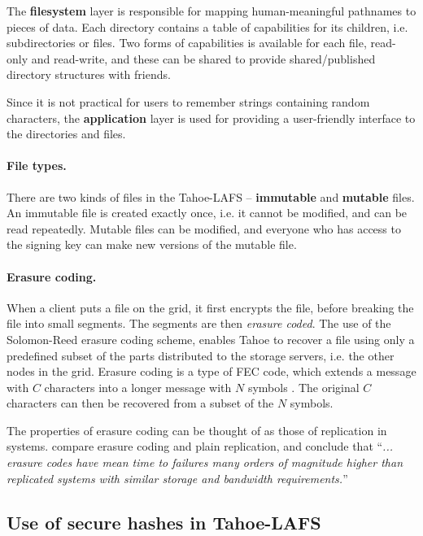 \documentclass[english,12pt,a4paper]{book}
\begin{document}
The \textbf{filesystem} layer is responsible for mapping human-meaningful
pathnames to pieces of data. Each directory contains a table of capabilities
for its children, i.e. subdirectories or files. Two forms of capabilities is
available for each file, read-only and read-write, and these can be shared to
provide shared/published directory structures with friends.

Since it is not practical for users to remember strings containing random
characters, the \textbf{application} layer is used for providing a user-friendly
interface to the directories and files.

\paragraph{File types.}

There are two kinds of files in the Tahoe-\ac{LAFS} -- \textbf{immutable} and
\textbf{mutable} files. An immutable file is created exactly once, i.e. it
cannot be modified, and can be read repeatedly. Mutable files can be modified,
and everyone who has access to the signing key can make new versions of
the mutable file.

\paragraph{Erasure coding.}

When a client puts a file on the grid, it first encrypts the file, before
breaking the file into small segments. The segments are then \emph{erasure
coded}.  The use of the Solomon-Reed erasure coding scheme, enables Tahoe to
recover a file using only a predefined subset of the parts distributed to the
storage servers, i.e. the other nodes in the grid. Erasure coding is a type of
\ac{FEC} code, which extends a message with $C$ characters into a longer message
with $N$ symbols \cite{t_reed-solomon}.  The original $C$ characters can then be
recovered from a subset of the $N$ symbols.

The properties of erasure coding can be thought of as those of replication in
 systems. \citet*{t_erasure} compare erasure coding and plain
replication, and conclude that ``\emph{...  erasure codes have mean time to
failures many orders of magnitude higher than replicated systems with similar
storage and bandwidth requirements.}''

\subsection{Use of secure hashes in Tahoe-LAFS}
\end{document}
